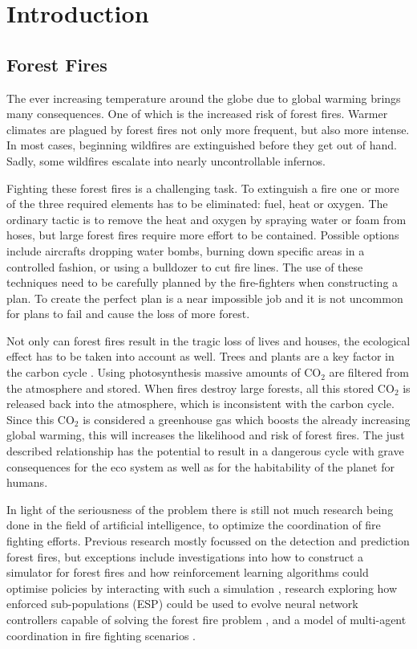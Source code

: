 
\section{Introduction}\label{sec:introduction}

\subsection{Forest Fires}
The ever increasing temperature around the globe due to global warming brings many consequences. One of which is the increased risk of forest fires. Warmer climates are plagued by forest fires not only more frequent, but also more intense.  In most cases, beginning wildfires are extinguished before they get out of hand. Sadly, some wildfires escalate into nearly uncontrollable infernos.

Fighting these forest fires is a challenging task. To extinguish a fire one or more of the three required elements has to be eliminated: fuel, heat or oxygen. The ordinary tactic is to remove the heat and oxygen by spraying water or foam from hoses, but large forest fires require more effort to be contained. Possible options include aircrafts dropping water bombs, burning down specific areas in a controlled fashion, or using a bulldozer to cut fire lines. The use of these techniques need to be carefully planned by the fire-fighters when constructing a plan. To create the perfect plan is a near impossible job and it is not uncommon for plans to fail and cause the loss of more forest.

Not only can forest fires result in the tragic loss of lives and houses, the ecological effect has to be taken into account as well. Trees and plants are a key factor in the carbon cycle \citep{kasischke1995fire}. Using photosynthesis massive amounts of CO$_{2}$ are filtered from the atmosphere and stored. When fires destroy large forests, all this stored CO$_{2}$ is released back into the atmosphere, which is inconsistent with the carbon cycle. Since this CO$_{2}$ is considered a greenhouse gas \citep{houghton1991climate} which boosts the already increasing global warming, this will increases the likelihood and risk of forest fires. The just described relationship has the potential to result in a dangerous cycle with grave consequences for the eco system as well as for the habitability of the planet for humans.

In light of the seriousness of the problem there is still not much research being done in the field of artificial intelligence, to optimize the coordination of fire fighting efforts. Previous research mostly focussed on the detection and prediction forest fires, but exceptions include investigations into how to construct a simulator for forest fires and how reinforcement learning algorithms could optimise policies by interacting with such a simulation \citep{wiering1998learning}, research exploring how enforced sub-populations (ESP) could be used to evolve neural network controllers capable of solving the forest fire problem \citep{wiering2005evolving}, and a model of multi-agent coordination in fire fighting scenarios \citep{moura2007fighting}.

